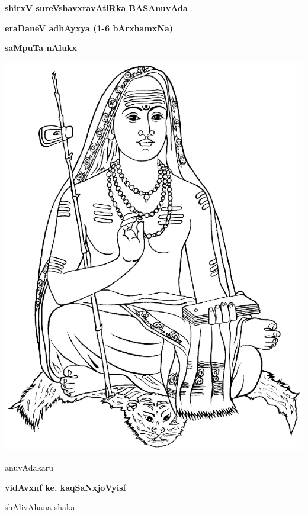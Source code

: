 \thispagestyle{empty}
\begin{center}
{\Huge\bfseries shirxV sureVshavxravAtiRka BASAnuvAda}
\bigskip

{\Large\bfseries eraDaneV adhAyxya (1-6 bArxhamxNa)}
\bigskip

{\Large\bfseries saMpuTa nAlukx}
\vfill

\includegraphics[scale=0.7]{figures/shankaracharya.eps}

\vfill

anuvAdakaru
\smallskip

{\large\bfseries vidAvxnf ke. kaqSaNxjoVyisf}

\smallskip
shAlivAhana shaka

\end{center}
